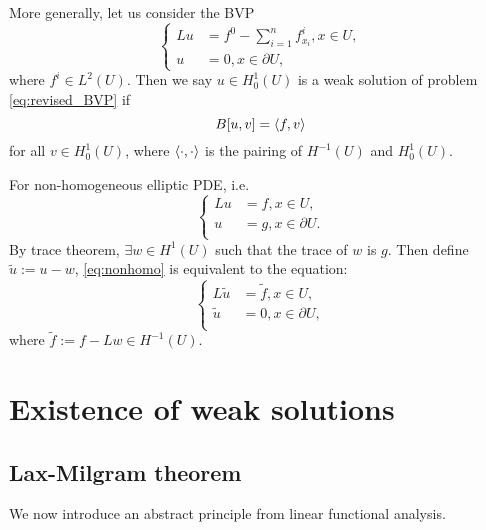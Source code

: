 More generally, let us consider the BVP 
\begin{equation}
    \label{eq:revised_BVP}
    \left\{
        \begin{aligned}
            Lu&=f^{0}-\sum_{i=1}^{n}f_{x_{i}}^{i},x\in U,\\
            u&=0,x\in\partial U,
        \end{aligned}
    \right.
\end{equation}
where $f^{i}\in L^{2}(U)$. Then we say $u\in H_{0}^{1}(U)$ is a weak solution of problem \eqref{eq:revised_BVP} if 
\begin{equation}
    B[u,v]=\left<f,v\right>
\end{equation}
for all $v\in H_{0}^{1}(U)$, where $\left<\cdot,\cdot\right>$ is the pairing of $H^{-1}(U)$ and $H_{0}^{1}(U)$.

For non-homogeneous elliptic PDE, i.e.
\begin{equation}
    \label{eq:nonhomo}
    \left\{
        \begin{aligned}
            Lu&=f,x\in U,\\
            u&=g,x\in \partial U.\\
        \end{aligned}
    \right.
\end{equation}
By trace theorem, $\exists w\in H^{1}(U)$ such that the trace of $w$ is $g$. Then define $\tilde{u}:=u-w$, \eqref{eq:nonhomo} is equivalent to the equation:
\begin{equation}
    \label{eq:change_to_homogeneous}
    \left\{
        \begin{aligned}
            L\tilde{u}&=\tilde{f},x\in U,\\
            \tilde{u}&=0,x\in\partial U,\\
        \end{aligned}
    \right.
\end{equation}
where $\tilde{f}:=f-Lw\in H^{-1}(U)$.
\section{Existence of weak solutions}
\subsection{Lax-Milgram theorem}
We now introduce an abstract principle from linear functional analysis. 

